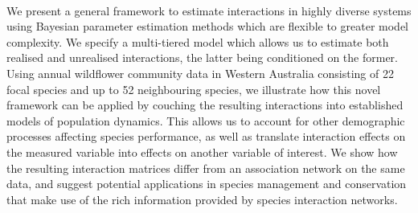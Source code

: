 \documentclass[a4,12pt]{article}
\begin{document}
    \paragraph{} %
    We present a general framework to estimate interactions in highly diverse systems using Bayesian parameter estimation methods which are flexible to greater model complexity. We specify a multi-tiered model which allows us to estimate both realised and unrealised interactions, the latter being conditioned on the former. Using annual wildflower community data in Western Australia consisting of 22 focal species and up to 52 neighbouring species, we illustrate how this novel framework can be applied by couching the resulting interactions into established models of population dynamics. This allows us to account for other demographic processes affecting species performance, as well as translate interaction effects on the measured variable into effects on another variable of interest. We show how the resulting interaction matrices differ from an association network on the same data, and suggest potential applications in species management and conservation that make use of the rich information provided by species interaction networks.

\end{document}

